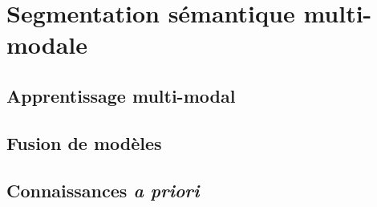 \chapter{Segmentation sémantique multi-modale}

\section{Apprentissage multi-modal}

\section{Fusion de modèles}

\section{Connaissances \textit{a priori}}
